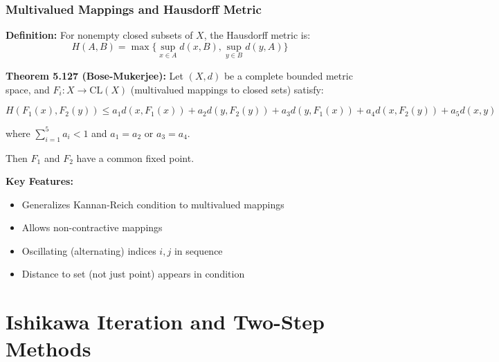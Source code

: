 \documentclass[aspectratio=169,10pt]{beamer}
\begin{document}
\begin{frame}
\frametitle{Multivalued Mappings and Hausdorff Metric}

\textbf{Definition:} For nonempty closed subsets of $X$, the Hausdorff metric is:
$$H(A, B) = \max\{\sup_{x \in A} d(x, B), \sup_{y \in B} d(y, A)\}$$

\vspace{0.3cm}

\textbf{Theorem 5.127 (Bose-Mukerjee):} Let $(X, d)$ be a complete bounded metric space,
and $F_i: X \to \text{CL}(X)$ (multivalued mappings to closed sets) satisfy:

\vspace{0.15cm}

$$H(F_1(x), F_2(y)) \leq a_1 d(x, F_1(x)) + a_2 d(y, F_2(y)) + a_3 d(y, F_1(x)) + a_4 d(x, F_2(y)) + a_5 d(x, y)$$

where $\sum_{i=1}^5 a_i < 1$ and $a_1 = a_2$ or $a_3 = a_4$.

\vspace{0.2cm}

Then $F_1$ and $F_2$ have a common fixed point.

\vspace{0.3cm}

\textbf{Key Features:}
\begin{itemize}
    \item Generalizes Kannan-Reich condition to multivalued mappings
    \item Allows non-contractive mappings
    \item Oscillating (alternating) indices $i, j$ in sequence
    \item Distance to set (not just point) appears in condition
\end{itemize}

\end{frame}

\section{Ishikawa Iteration and Two-Step Methods}
\end{document}
